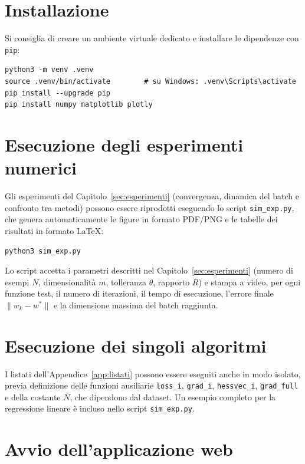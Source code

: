 \documentclass[italian, a4paper, twoside, binding=6mm]{sapthesis}
\begin{document}
\section{Installazione}

Si consiglia di creare un ambiente virtuale dedicato e installare le
dipendenze con \texttt{pip}:

\begin{verbatim}
python3 -m venv .venv
source .venv/bin/activate        # su Windows: .venv\Scripts\activate
pip install --upgrade pip
pip install numpy matplotlib plotly
\end{verbatim}

\section{Esecuzione degli esperimenti numerici}

Gli esperimenti del Capitolo~\ref{sec:esperimenti} (convergenza, dinamica del
batch e confronto tra metodi) possono essere riprodotti eseguendo lo script
\texttt{sim\_exp.py}, che genera automaticamente le figure in formato PDF/PNG e
le tabelle dei risultati in formato LaTeX:

\begin{verbatim}
python3 sim_exp.py
\end{verbatim}

Lo script accetta i parametri descritti nel Capitolo~\ref{sec:esperimenti}
(numero di esempi $N$, dimensionalità $m$, tolleranza $\theta$, rapporto
$R$) e stampa a video, per ogni funzione test, il numero di iterazioni, il
tempo di esecuzione, l'errore finale $\|w_k - w^*\|$ e la dimensione massima
del batch raggiunta.

\section{Esecuzione dei singoli algoritmi}

I listati dell'Appendice~\ref{app:listati} possono essere eseguiti anche in
modo isolato, previa definizione delle funzioni ausiliarie
\texttt{loss\_i}, \texttt{grad\_i}, \texttt{hessvec\_i}, \texttt{grad\_full}
e della costante $N$, che dipendono dal dataset. Un esempio completo per la
regressione lineare è incluso nello script \texttt{sim\_exp.py}.

\section{Avvio dell'applicazione web}
\end{document}
